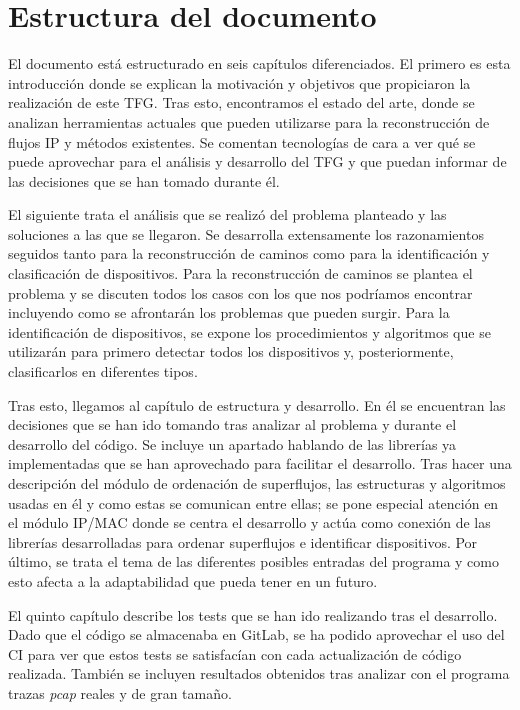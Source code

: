 \documentclass[tfg,epsbased,lof,lot,loa,final,nocopyright,overleaf]{tfgtfmthesisuam}
\begin{document}
\section{Estructura del documento}
El documento está estructurado en seis capítulos diferenciados. El primero es esta introducción donde se explican la motivación y objetivos que propiciaron la realización de este TFG. Tras esto, encontramos el estado del arte, donde se analizan herramientas actuales que pueden utilizarse para la reconstrucción de flujos IP y métodos existentes. Se comentan tecnologías de cara a ver qué se puede aprovechar para el análisis y desarrollo del TFG y que puedan informar de las decisiones que se han tomado durante él.

El siguiente trata el análisis que se realizó del problema planteado y las soluciones a las que se llegaron. Se desarrolla extensamente los razonamientos seguidos tanto para la reconstrucción de caminos como para la identificación y clasificación de dispositivos. Para la reconstrucción de caminos se plantea el problema y se discuten todos los casos con los que nos podríamos encontrar incluyendo como se afrontarán los problemas que pueden surgir. Para la identificación de dispositivos, se expone los procedimientos y algoritmos que se utilizarán para primero detectar todos los dispositivos y, posteriormente, clasificarlos en diferentes tipos.

Tras esto, llegamos al capítulo de estructura y desarrollo. En él se encuentran las decisiones que se han ido tomando tras analizar al problema y durante el desarrollo del código. Se incluye un apartado hablando de las librerías ya implementadas que se han aprovechado para facilitar el desarrollo. Tras hacer una descripción del módulo de ordenación de superflujos, las estructuras y algoritmos usadas en él y como estas se comunican entre ellas; se pone especial atención en el módulo IP/MAC donde se centra el desarrollo y actúa como conexión de las librerías desarrolladas para ordenar superflujos e identificar dispositivos. Por último, se trata el tema de las diferentes posibles entradas del programa y como esto afecta a la adaptabilidad que pueda tener en un futuro.

El quinto capítulo describe los tests que se han ido realizando tras el desarrollo. Dado que el código se almacenaba en GitLab, se ha podido aprovechar el uso del CI para ver que estos tests se satisfacían con cada actualización de código realizada. También se incluyen resultados obtenidos tras analizar con el programa trazas \textit{pcap} reales y de gran tamaño.
\end{document}
